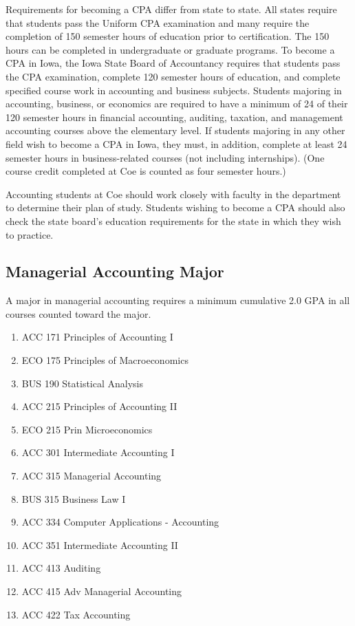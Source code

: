 \documentclass[
  letterpaper,
]{scrbook}
\providecommand{\tightlist}{%
  \setlength{\itemsep}{0pt}\setlength{\parskip}{0pt}}
\begin{document}
Requirements for becoming a CPA differ from state to state. All states
require that students pass the Uniform CPA examination and many require
the completion of 150 semester hours of education prior to
certification. The 150 hours can be completed in undergraduate or
graduate programs. To become a CPA in Iowa, the Iowa State Board of
Accountancy requires that students pass the CPA examination, complete
120 semester hours of education, and complete specified course work in
accounting and business subjects. Students majoring in accounting,
business, or economics are required to have a minimum of 24 of their 120
semester hours in financial accounting, auditing, taxation, and
management accounting courses above the elementary level. If students
majoring in any other field wish to become a CPA in Iowa, they must, in
addition, complete at least 24 semester hours in business-related
courses (not including internships). (One course credit completed at Coe
is counted as four semester hours.)

Accounting students at Coe should work closely with faculty in the
department to determine their plan of study. Students wishing to become
a CPA should also check the state board's education requirements for the
state in which they wish to practice.

\subsection{Managerial Accounting
Major}\label{managerial-accounting-major}

A major in managerial accounting requires a minimum cumulative 2.0 GPA
in all courses counted toward the major.

\begin{enumerate}
\def\labelenumi{\arabic{enumi}.}
\tightlist
\item
  ACC 171 Principles of Accounting I
\item
  ECO 175 Principles of Macroeconomics
\item
  BUS 190 Statistical Analysis
\item
  ACC 215 Principles of Accounting II
\item
  ECO 215 Prin Microeconomics
\item
  ACC 301 Intermediate Accounting I
\item
  ACC 315 Managerial Accounting
\item
  BUS 315 Business Law I
\item
  ACC 334 Computer Applications - Accounting
\item
  ACC 351 Intermediate Accounting II
\item
  ACC 413 Auditing
\item
  ACC 415 Adv Managerial Accounting
\item
  ACC 422 Tax Accounting
\end{enumerate}
\end{document}
